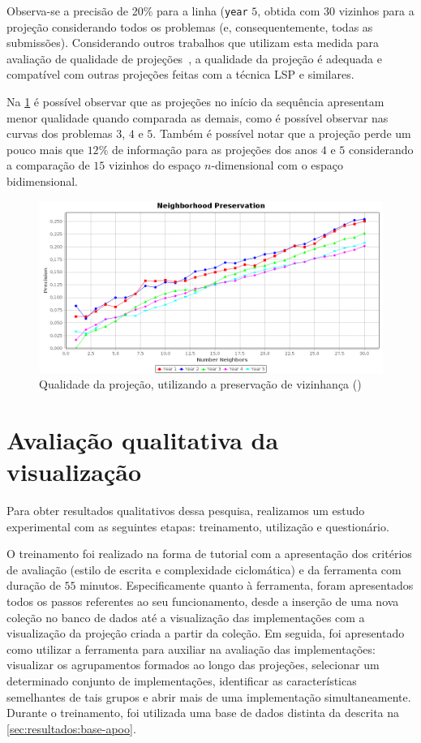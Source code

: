	Observa-se a precisão de 20\% para a linha (\texttt{year} $5$, obtida com 30 vizinhos para a
	projeção considerando todos os problemas (e, consequentemente, todas as submissões). Considerando
	outros trabalhos que utilizam esta medida para avaliação de qualidade de projeções~\cite{phd:paulovich},
	a qualidade da projeção é adequada e compatível com outras projeções feitas com a técnica LSP e
	similares.
	
	
	Na \cref{fig:neighborhoodAPOO30} é possível observar que as projeções no início da
	sequência apresentam menor qualidade quando comparada as demais, como é possível observar
	nas curvas dos problemas $3$, $4$ e $5$. Também é
	possível notar que a projeção perde um pouco mais que $12\%$ de informação para as
	projeções dos anos $4$ e $5$ considerando a comparação de $15$ vizinhos do espaço
	$n$-dimensional com o espaço bidimensional.
	
	
	\begin{figure}
		\centering
		\includegraphics[width=0.7\linewidth]{imagem/neighborhoodAPOO30}
		\caption{Qualidade da projeção, utilizando a preservação de vizinhança ()}
		\label{fig:neighborhoodAPOO30}
	\end{figure}	

	
	\section{Avaliação qualitativa da visualização}
	\label{sec:avalQualitativa}
	
		Para obter resultados qualitativos dessa pesquisa, realizamos um estudo experimental com
		as seguintes etapas: treinamento, utilização e questionário.
		
		
		O treinamento foi realizado na forma de tutorial com a apresentação dos critérios
		de avaliação (estilo de escrita e complexidade ciclomática) e da ferramenta com
		duração de $55$ minutos. Especificamente quanto à ferramenta, foram apresentados
		todos os passos referentes ao seu funcionamento, desde a inserção de uma nova
		coleção no banco de dados até a visualização das implementações com a visualização
		da projeção criada a partir da coleção. Em seguida, foi apresentado como utilizar
		a ferramenta para auxiliar na avaliação das implementações: visualizar os
		agrupamentos formados ao longo das projeções, selecionar um determinado conjunto
		de implementações, identificar as características semelhantes de tais grupos e
		abrir mais de uma implementação simultaneamente. Durante o treinamento, foi utilizada uma
		base de dados distinta da descrita na \cref{sec:resultados:base-apoo}.
		
